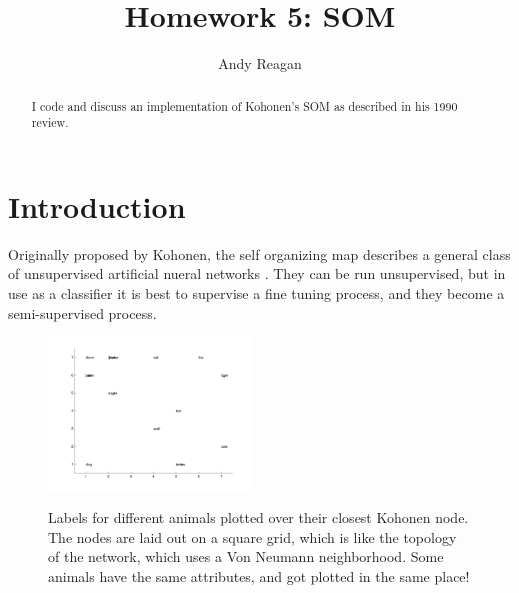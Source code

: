 \documentclass[pre,twocolumn,twoside,byrevtex,superscriptaddress]{revtex4}
\begin{document}




\title{\vspace{-2cm}Homework 5: SOM}
\author{Andy Reagan}

\begin{abstract}
I code and discuss an implementation of Kohonen's SOM as described in his 1990 review.
\end{abstract}

\maketitle

\section{Introduction}

Originally proposed by Kohonen, the self organizing map describes a general class of unsupervised artificial nueral networks \cite{kohonen1990self}.
They can be run unsupervised, but in use as a classifier it is best to supervise a fine tuning process, and they become a semi-supervised process.

\begin{figure}
 \centering
  \includegraphics[width=0.48\textwidth]{figures/animals-layout.png}
  \label{fig:1}
  \caption{Labels for different animals plotted over their closest Kohonen node.
The nodes are laid out on a square grid, which is like the topology of the network, which uses a Von Neumann neighborhood.
Some animals have the same attributes, and got plotted in the same place!}
\end{figure}
\end{document}
